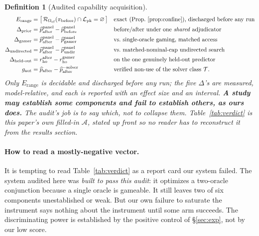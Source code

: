\documentclass[11pt]{article}
\newtheorem{definition}{Definition}
\newcommand{\PK}{\ensuremath{\mathcal{L}_{\mathrm{pk}}}}
\newcommand{\Ocf}{\ensuremath{\Omega_{\mathrm{cf}}}}
\newcommand{\Rze}[2]{\ensuremath{\mathcal{R}_{#1}(#2)}}
\begin{document}
\begin{definition}[Audited capability acquisition]
\begin{equation}\label{eq:cert}
\begin{aligned}
E_{\mathrm{range}} &= \bigl[\,\Rze{\Ocf}{\pi_{\mathrm{before}}}\cap\PK=\varnothing\,\bigr]
  &&\text{exact (Prop.~\ref{prop:confine}), discharged before any run}\\
\Delta_{\mathrm{prior}} &= \widehat p^{\mathrm{panel}}_{\mathrm{after}}-\widehat p^{\mathrm{panel}}_{\mathrm{before}}
  &&\text{before/after under one \emph{shared} adjudicator}\\
\Delta_{\mathrm{gamer}} &= \widehat p^{\mathrm{panel}}_{\mathrm{after}}-\widehat p^{\mathrm{panel}}_{\mathrm{gamer}}
  &&\text{vs.\ single-oracle gaming, matched access}\\
\Delta_{\mathrm{undirected}} &= \widehat p^{\mathrm{panel}}_{\mathrm{after}}-\widehat p^{\mathrm{panel}}_{\mathrm{undir}}
  &&\text{vs.\ matched-nominal-cap undirected search}\\
\Delta_{\mathrm{held\text{-}out}} &= r_{\mathrm{ho}}^{\mathrm{after}}-r_{\mathrm{ho}}^{\mathrm{gamer}}
  &&\text{on the one genuinely held-out predictor}\\
g_{\mathrm{aut}} &= \widehat p_{\mathrm{after}}-\widehat p^{-\mathrm{solver}}_{\mathrm{after}}
  &&\text{verified non-use of the solver class }\mathcal T .
\end{aligned}
\end{equation}
Only $E_{\mathrm{range}}$ is decidable and discharged before any run; the five $\Delta$'s are measured,
model-relative, and each is reported with an effect size and an interval. \textbf{A study may establish some
components and fail to establish others, as ours does.} The audit's job is to say which, not to collapse
them. Table~\ref{tab:verdict} is this paper's own filled-in $\mathcal A$, stated up front so no reader has to
reconstruct it from the results section.
\end{definition}


\paragraph{How to read a mostly-negative vector.} It is tempting to read Table~\ref{tab:verdict} as a report
card our system failed. The system audited here was \emph{built to pass this audit}: it optimizes a
two-oracle conjunction because a single oracle is gameable. It still leaves two of six components
unestablished or weak. But our own failure to saturate the instrument says nothing about the
instrument until some arm succeeds. The discriminating power is established by the positive control of
\S\ref{sec:exp}, not by our low score.
\end{document}
